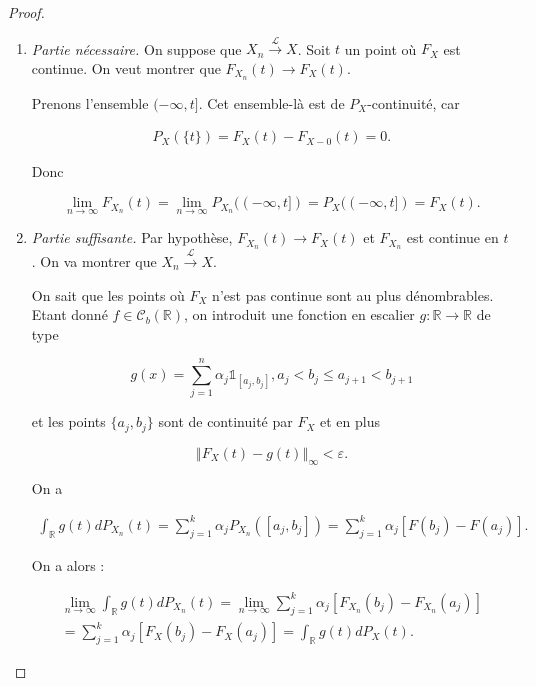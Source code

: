 \documentclass[french]{book}
\theoremstyle{definition}
\theoremstyle{remark}
\newcommand{\lesss}{<}
\newcommand{\less}{\lesss}
\begin{document}
\begin{proof}

  \

  \begin{enumerate}
    \item \emph{Partie nécessaire.} On suppose que \(X_n \stackrel{\mathscr{L}}{\longrightarrow} X\). Soit \(t\) un point où \(F_X\) est continue. On veut montrer que \(F _{X_n}(t) \longrightarrow F_X(t)\).

    Prenons l'ensemble \((-\infty, t]\). Cet ensemble-là est de \(P_X\)-continuité, car

    \begin{gather*}
      P_X(\{ t \}) = F_X(t) - F_{X-0}(t)=0.
    \end{gather*}

    Donc

    \[\lim_{n \to \infty} F _{X_n}(t) = \lim_{n \to \infty} P _{X_n}((-\infty, t]) = P_X((-\infty, t]) = F_X(t).\]

    \item \emph{Partie suffisante.} Par hypothèse, \(F _{X_n}(t) \longrightarrow F_X(t)\) et \(F _{X_n}\) est continue en \(t\). On va montrer que \(X_n \stackrel{\mathscr{L}}{\longrightarrow} X\).

    On sait que les points où \(F_X\) n'est pas continue sont au plus dénombrables. Etant donné \(f \in \mathscr{C}_b(\mathbb{R})\), on introduit une fonction en escalier \(g : \mathbb{R} \longrightarrow \mathbb{R}\) de type

    \[g(x) = \sum_{j=1}^{n} \alpha_j \mathds{1}_{[a_j, b_j]}, a_j \less b_j \leq a _{j+1} \less b _{j+1} \]

    et les points \(\{ a_j, b_j \}\) sont de continuité par \(F_X\) et en plus

    \[\left\Vert F_X(t)-g(t) \right\Vert_{\infty} \less \varepsilon. \]

    On a

    \begin{gather*}
      \int_{\mathbb{R}} g(t) d P _{X_n}(t) = \sum_{j=1}^{k} \alpha_j P _{X_n}([a_j,b_j]) = \sum_{j=1}^{k} \alpha_j [F(b_j)-F(a_j)].
    \end{gather*}

    On a alors :

    \begin{gather*}
      \lim_{n \to \infty} \int_{\mathbb{R}}^{} g(t) d P _{X_n}(t) = \lim_{n \to \infty} \sum_{j=1}^{k} \alpha_j[F _{X_n}(b_j) - F _{X_n}(a_j)] \\
      = \sum_{j=1}^{k} \alpha_j[F_X(b_j)- F_X(a_j)] = \int_{\mathbb{R}}^{}g(t)d P_X(t).
    \end{gather*}


\end{enumerate}
\end{proof}
\end{document}

